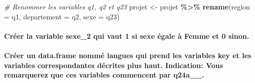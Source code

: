 \documentclass[
]{article}
\newenvironment{Shaded}{\begin{snugshade}}{\end{snugshade}}
\newcommand{\AttributeTok}[1]{\textcolor[rgb]{0.13,0.29,0.53}{#1}}
\newcommand{\CommentTok}[1]{\textcolor[rgb]{0.56,0.35,0.01}{\textit{#1}}}
\newcommand{\DecValTok}[1]{\textcolor[rgb]{0.00,0.00,0.81}{#1}}
\newcommand{\FunctionTok}[1]{\textcolor[rgb]{0.13,0.29,0.53}{\textbf{#1}}}
\newcommand{\NormalTok}[1]{#1}
\newcommand{\OtherTok}[1]{\textcolor[rgb]{0.56,0.35,0.01}{#1}}
\newcommand{\SpecialCharTok}[1]{\textcolor[rgb]{0.81,0.36,0.00}{\textbf{#1}}}
\newcommand{\StringTok}[1]{\textcolor[rgb]{0.31,0.60,0.02}{#1}}
\begin{document}
\hfill\break

\begin{Shaded}
\begin{Highlighting}[]
\CommentTok{\# Renommer les variables q1, q2 et q23}
\NormalTok{projet }\OtherTok{\textless{}{-}}\NormalTok{ projet }\SpecialCharTok{\%\textgreater{}\%}
              \FunctionTok{rename}\NormalTok{(}\AttributeTok{region =}\NormalTok{ q1, }\AttributeTok{departement =}\NormalTok{ q2, }\AttributeTok{sexe =}\NormalTok{ q23)}
\end{Highlighting}
\end{Shaded}

\hfill\break

\hypertarget{cruxe9er-la-variable-sexe_2-qui-vaut-1-si-sexe-uxe9gale-uxe0-femme-et-0-sinon.}{%
\paragraph{Créer la variable sexe\_2 qui vaut 1 si sexe égale à Femme et
0
sinon.}\label{cruxe9er-la-variable-sexe_2-qui-vaut-1-si-sexe-uxe9gale-uxe0-femme-et-0-sinon.}}

\hfill\break

\begin{Shaded}
\end{Shaded}

\hfill\break

\hypertarget{cruxe9er-un-data.frame-nommuxe9-langues-qui-prend-les-variables-key-et-les-variables-correspondantes-duxe9crites-plus-haut.-indication-vous-remarquerez-que-ces-variables-commencent-par-q24a__.}{%
\paragraph{Créer un data.frame nommé langues qui prend les variables key
et les variables correspondantes décrites plus haut. Indication: Vous
remarquerez que ces variables commencent par
q24a\_\_.}\label{cruxe9er-un-data.frame-nommuxe9-langues-qui-prend-les-variables-key-et-les-variables-correspondantes-duxe9crites-plus-haut.-indication-vous-remarquerez-que-ces-variables-commencent-par-q24a__.}}
\end{document}
